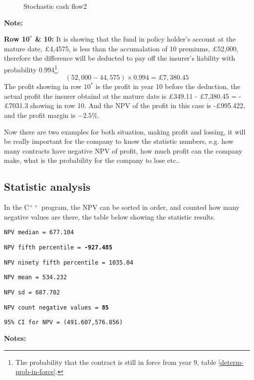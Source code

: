 \documentclass{report}
\begin{document}
{\begin{figure}[H]
\begin{tabular}{p{0.5cm} p{1.5cm} p{1.3cm} p{1cm} p{1.5cm} p{1.2cm} p{1.3cm} p{1.3cm}p{1.6cm}p{1.5cm}p{1.3cm} }
\bottomrule
\end{tabular}
\caption{Stochastic cash flow2}
\label{stoch-cashflow}
\end{figure}


\textbf{Note:}


\textbf{Row 10$^*$ \& 10:} It is showing that the fund in policy holder's account at the mature date, \pounds 4,4575, is less than the accumalation of 10 premiums, \pounds 52,000, therefore the difference will be deducted to pay off the insurer's liability with probability 0.994\footnote{The probability that the contract is still in force from year 9, table \ref{determ-prob-in-force}.}. 
\[
(52,000- 44,575)\times 0.994= \pounds 7,380.45 
\]
The profit showing in row $10^*$ is the profit in year 10 before the deduction, the actual profit the insurer obtaind at the mature date is \pounds349.11 - \pounds7,380.45 = -\pounds 7031.3 showing in row 10. And the NPV of the profit in this case is -\pounds995.422, and the profit margin is $-2.5\%$.



Now there are two examples for both situation, making profit and lossing, it will be really important for the company to know the statistic numbers, e.g. how many contracts have negative NPV of profit, how much profit can the company make, what is the probability for the company to lose etc..

\subsection{Statistic analysis}

In the C$^{++}$ program, the NPV can be sorted in order, and counted how many negative values are there, the table below showing the statistic results. 

\texttt{NPV median = 677.104}

{\renewcommand\baselinestretch{1}\selectfont


\texttt{NPV fifth percentile = \textbf{-927.485}}

\texttt{NPV ninety fifth percentile = 1035.04}

\texttt{NPV mean = 534.232}

\texttt{NPV sd = 687.702}

\texttt{NPV count negative values = \textbf{85}}

\texttt{95\% CI for NPV = (491.607,576.856)}
\par}

\textbf{Notes:} 

}
\end{document}
